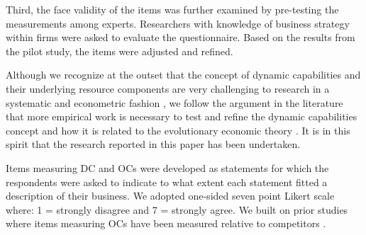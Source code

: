 \documentclass[review,fleqn]{elsarticle}\usepackage[]{graphicx}\usepackage[]{color}
\begin{document}
Third, the face validity of the items was further examined by pre-testing the measurements
among experts. Researchers with knowledge of business strategy within firms were asked to
evaluate the questionnaire. Based on the results from the pilot study, the items were
adjusted and refined.

Although we recognize at the outset that the concept of dynamic capabilities and their
underlying resource components are very challenging to research in a systematic and
econometric fashion \citep{McKelvie2009}, we follow the argument in the
literature that more empirical work is necessary to test and refine the dynamic
capabilities concept and how it is related to the evolutionary economic theory
\citep{Arend2009,McKelvie2009} .  It
is in this spirit that the research reported in this paper has been undertaken.

Items measuring DC and OCs were developed as statements for which the respondents were
asked to indicate to what extent each statement fitted a description of their business. We
adopted one-sided seven point Likert scale where: 1 = strongly disagree and 7 = strongly
agree. We built on prior studies where items measuring OCs have been measured relative to
competitors \citep{McKelvie2009}.



  \providecommand{\huxb}[2]{\arrayrulecolor[RGB]{#1}\global\arrayrulewidth=#2pt}
  \providecommand{\huxvb}[2]{\color[RGB]{#1}\vrule width #2pt}
  \providecommand{\huxtpad}[1]{\rule{0pt}{\baselineskip+#1}}
  \providecommand{\huxbpad}[1]{\rule[-#1]{0pt}{#1}}
\end{document}
